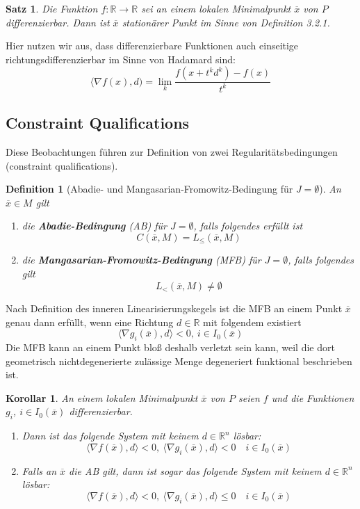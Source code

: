 \documentclass[11pt]{scrreprt}
\newcounter{thm}
\theoremstyle{thmstyle}
\numberwithin{thm}{section}
\newtheorem{definition}[thm]{Definition}
\newtheorem{korollar}[thm]{Korollar}
\newtheorem{satz}[thm]{Satz}
\begin{document}
\begin{satz}
	Die Funktion $f \colon \mathbb{R} \rightarrow \mathbb{R}$ sei an einem lokalen Minimalpunkt $\overline{x}$ von $P$ differenzierbar. Dann ist $\overline{x}$ stationärer Punkt im Sinne von Definition 3.2.1.	
\end{satz}

Hier nutzen wir aus, dass differenzierbare Funktionen auch einseitige richtungsdifferenzierbar im Sinne von Hadamard sind:
$$ \langle \nabla f(x), d) = \lim_k \frac{f(x + t^k d^k) - f(x)}{t^k} $$

\subsection*{Constraint Qualifications}

Diese Beobachtungen führen zur Definition von zwei Regularitätsbedingungen (constraint qualifications).

\begin{definition}[Abadie- und Mangasarian-Fromowitz-Bedingung für $J = \emptyset$]
	An $\overline{x} \in M$ gilt
	\begin{enumerate}[label=\alph*\upshape)]
		\item die \textbf{Abadie-Bedingung} (AB) für $J = \emptyset$, falls folgendes erfüllt ist
			$$ C(\overline{x}, M) = L_{\leq}(\overline{x}, M) $$
		\item die \textbf{Mangasarian-Fromowitz-Bedingung} (MFB) für $J = \emptyset$, falls folgendes gilt
			$$ L_{<}(\overline{x}, M) \neq \emptyset $$
	\end{enumerate}
\end{definition}

Nach Definition des inneren Linearisierungskegels ist die MFB an einem Punkt $\overline{x}$ genau dann erfüllt, wenn eine Richtung $d \in \mathbb{R}$ mit folgendem existiert
$$ \langle \nabla g_i(\overline{x}), d \rangle < 0, ~i \in I_0(\overline{x}) $$
Die MFB kann an einem Punkt bloß deshalb verletzt sein kann, weil die dort geometrisch nichtdegenerierte zulässige Menge degeneriert funktional beschrieben ist.

\begin{korollar}
	An einem lokalen Minimalpunkt $\overline{x}$ von $P$ seien $f$ und die Funktionen $g_i$, $i \in I_0(\overline{x})$ differenzierbar.
	\begin{enumerate}[label=\alph*\upshape)]
		\item Dann ist das folgende System mit keinem $d \in \mathbb{R}^n$ lösbar:
			$$ \langle \nabla f(\overline{x}), d \rangle < 0, ~\langle \nabla g_i(\overline{x}), d \rangle < 0 \quad i \in I_0(\overline{x}) $$
		\item Falls an $\overline{x}$ die AB gilt, dann ist sogar das folgende System mit keinem $d \in \mathbb{R}^n$ lösbar:
			$$ \langle \nabla f(\overline{x}), d \rangle < 0, ~ \langle \nabla g_i(\overline{x}), d \rangle \leq 0 \quad i \in I_0(\overline{x}) $$
	\end{enumerate}
\end{korollar}
 
\end{document}
